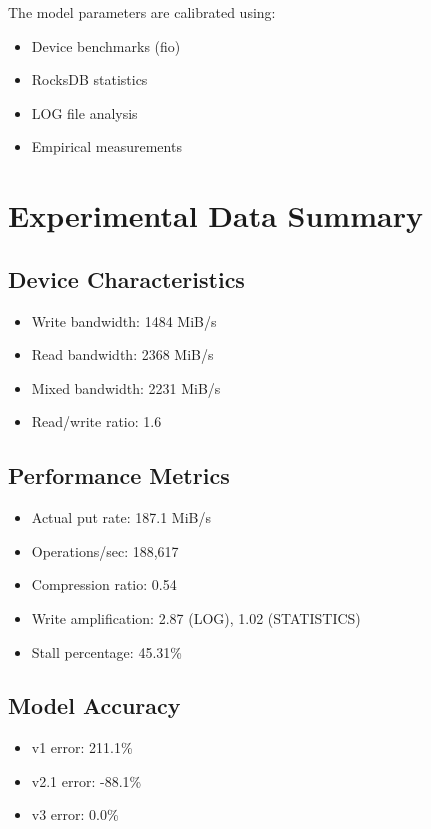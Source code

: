 \documentclass[11pt]{article}
\begin{document}
The model parameters are calibrated using:
\begin{itemize}
    \item Device benchmarks (fio)
    \item RocksDB statistics
    \item LOG file analysis
    \item Empirical measurements
\end{itemize}

\section{Experimental Data Summary}

\subsection{Device Characteristics}
\begin{itemize}
    \item Write bandwidth: 1484 MiB/s
    \item Read bandwidth: 2368 MiB/s
    \item Mixed bandwidth: 2231 MiB/s
    \item Read/write ratio: 1.6
\end{itemize}

\subsection{Performance Metrics}
\begin{itemize}
    \item Actual put rate: 187.1 MiB/s
    \item Operations/sec: 188,617
    \item Compression ratio: 0.54
    \item Write amplification: 2.87 (LOG), 1.02 (STATISTICS)
    \item Stall percentage: 45.31\%
\end{itemize}

\subsection{Model Accuracy}
\begin{itemize}
    \item v1 error: 211.1\%
    \item v2.1 error: -88.1\%
    \item v3 error: 0.0\%
\end{itemize}
\end{document}
